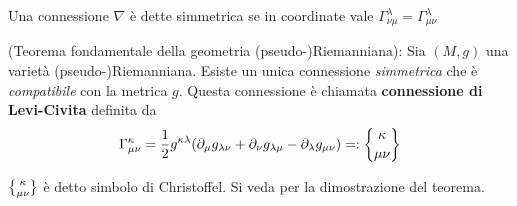 Una connessione $\nabla$ è dette simmetrica se in coordinate vale
$\Gamma^\lambda_{\nu\mu} = \Gamma^\lambda_{\mu\nu}$

\begin{theorem}{(Teorema fondamentale della geometria (pseudo-)Riemanniana):}
  Sia $(M,g)$ una varietà (pseudo-)Riemanniana. Esiste un unica connessione
  \emph{simmetrica} che è \emph{compatibile} con la metrica $g$. Questa connessione
  è chiamata \textbf{connessione di Levi-Civita} definita da
  $$
       \Gamma^\kappa_{\mu\nu} = \frac{1}{2} g^{\kappa\lambda}
           (\partial_\mu g_{\lambda\nu}  + \partial_\nu g_{\lambda\mu}
              - \partial_\lambda g_{\mu\nu}) = : \chrsym{\kappa}{\mu\nu}
  $$
\end{theorem}
$\chrsym{\kappa}{\mu\nu}$ è detto simbolo di Christoffel.
Si veda \cite{nakahara} per la dimostrazione del teorema.\\
